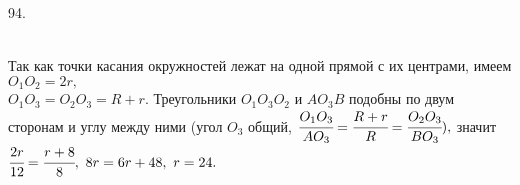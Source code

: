 94. \begin{figure}[ht!]
\end{figure}\\
Так как точки касания окружностей лежат на одной прямой с их центрами, имеем $O_1O_2=2r,$\\$O_1O_3=O_2O_3=R+r.$ Треугольники $O_1O_3O_2$ и $AO_3B$ подобны по двум сторонам и углу между ними (угол $O_3$ общий, $\cfrac{O_1O_3}{AO_3}=\cfrac{R+r}{R}=\cfrac{O_2O_3}{BO_3}),$ значит $\cfrac{2r}{12}=\cfrac{r+8}{8},\ 8r=6r+48,\ r=24.$\\
